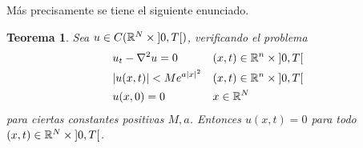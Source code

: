 \documentclass{article}
\newcommand{\realNumbers}{\mathbb{R}}
\newtheorem{theorem}{Teorema}
\newcommand{\leftOpenInterval}{\left]}
\newcommand{\rightOpenInterval}{\right[}
\newcommand{\leftClosedInterval}{\left[}
\newcommand{\rightClosedInterval}{\right]}
\newcommand{\interval}[3]{%
  \ifstrequal{#1}{oo}{%
    \leftOpenInterval #2, #3 \rightOpenInterval%
  }{%
    \ifstrequal{#1}{co}{%
      \leftClosedInterval #2, #3 \rightOpenInterval%
    }{%
      \ifstrequal{#1}{oc}{
        \leftOpenInterval #2, #3 \rightClosedInterval%
      }{%
        \ifstrequal{#1}{cc}{
          \leftClosedInterval #2, #3 \rightClosedInterval
        }{%
        }%
      }%
    }%
  }%
}
\theoremstyle{remark}
\begin{document}
Más precisamente se tiene el siguiente enunciado.

\begin{theorem}
  Sea \(u \in C(\realNumbers^N \times \interval{oo}{0}{T})\), verificando el problema
  \begin{align}
    &u_t - \laplacian u = 0
      && (x, t) \in \realNumbers^n \times \interval{oo}{0}{T}
    \\
    & \abs{u(x, t)} < M e^{a \abs{x}^2}
      && (x, t) \in \realNumbers^n \times \interval{oo}{0}{T}
    \\
    &u(x, 0) = 0
      && x \in \realNumbers^N
  \end{align}
  para ciertas constantes positivas \(M, a\).
  Entonces \(u(x, t) = 0\) para todo \((x, t) \in \realNumbers^N \times \interval{oo}{0}{T}\).
\end{theorem}
\end{document}
